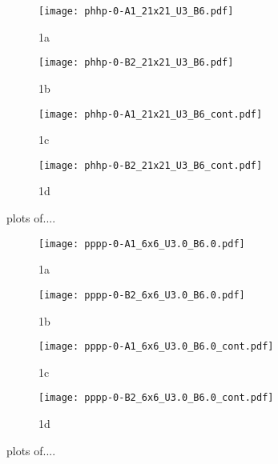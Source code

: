 \begin{figure}
  \begin{subfigure}{.5\textwidth}
    \centering
    \texttt{[image: phhp-0-A1\_21x21\_U3\_B6.pdf]}
    \caption{1a}
    \label{fig:sfig1}
  \end{subfigure}%
  \begin{subfigure}{.5\textwidth}
    \centering
    \texttt{[image: phhp-0-B2\_21x21\_U3\_B6.pdf]}
    \caption{1b}
    \label{fig:sfig2}
  \end{subfigure}
  \begin{subfigure}{.5\textwidth}
      \centering
      \texttt{[image: phhp-0-A1\_21x21\_U3\_B6\_cont.pdf]}
      \caption{1c}
      \label{fig:sfig3}
  \end{subfigure}
  \begin{subfigure}{.5\textwidth}
      \centering
      \texttt{[image: phhp-0-B2\_21x21\_U3\_B6\_cont.pdf]}
      \caption{1d}
      \label{fig:sfig4}
  \end{subfigure}
  \caption{plots of....}
  \label{fig:fig}
\end{figure}

\begin{figure}
  \begin{subfigure}{.5\textwidth}
    \centering
    \texttt{[image: pppp-0-A1\_6x6\_U3.0\_B6.0.pdf]}
    \caption{1a}
    \label{fig:sfig1}
  \end{subfigure}%
  \begin{subfigure}{.5\textwidth}
    \centering
    \texttt{[image: pppp-0-B2\_6x6\_U3.0\_B6.0.pdf]}
    \caption{1b}
    \label{fig:sfig2}
  \end{subfigure}
  \begin{subfigure}{.5\textwidth}
      \centering
      \texttt{[image: pppp-0-A1\_6x6\_U3.0\_B6.0\_cont.pdf]}
      \caption{1c}
      \label{fig:sfig3}
  \end{subfigure}
  \begin{subfigure}{.5\textwidth}
      \centering
      \texttt{[image: pppp-0-B2\_6x6\_U3.0\_B6.0\_cont.pdf]}
      \caption{1d}
      \label{fig:sfig4}
  \end{subfigure}
  \caption{plots of....}
  \label{fig:fig}
\end{figure}


